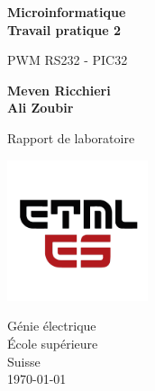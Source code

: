 \begin{titlepage}
   \begin{center}
        \vspace*{1cm}
        \LARGE
        \textbf{Microinformatique \\ Travail pratique 2}
        
        \vspace{0.3cm}
        PWM RS232 - PIC32
            
        \vspace{1.5cm}

        \textbf{Meven Ricchieri \\ Ali Zoubir}

        \vfill
            
        Rapport de  laboratoire
            
        \vspace{0.8cm}
     
        \includegraphics[width=0.31\textwidth]{./ETML-ES-LOGO.png}

        Génie électrique\\
        École supérieure\\
        Suisse\\
        \monthyeardate\today
            
   \end{center}
\end{titlepage}